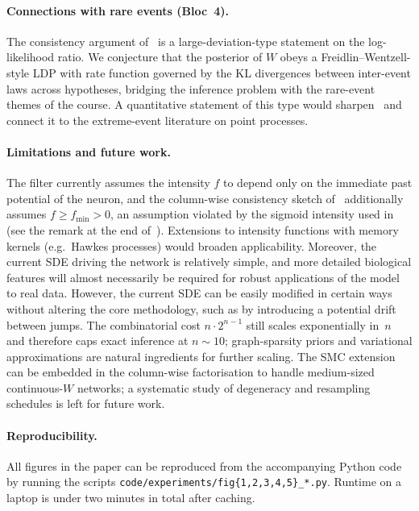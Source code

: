 \documentclass[11pt,a4paper]{article}
\theoremstyle{definition}
\begin{document}
\paragraph{Connections with rare events (Bloc~4).} The consistency
argument of~ is a large-deviation-type
statement on the log-likelihood ratio. We conjecture that the
posterior of $W$ obeys a Freidlin--Wentzell-style LDP with rate
function governed by the KL divergences between inter-event laws
across hypotheses, bridging the inference problem with the rare-event
themes of the course. A quantitative statement of this type would
sharpen~ and connect it to the extreme-event
literature on point processes.

\paragraph{Limitations and future work.} The filter currently assumes
the intensity $f$ to depend only on the immediate past potential of the neuron, and the column-wise consistency sketch of~ additionally assumes $f \geq f_{\min} > 0$, an assumption violated by the sigmoid intensity used in~ (see the remark at the end of~). Extensions to intensity functions with memory kernels (e.g.\ Hawkes
processes) would broaden applicability. Moreover, the current SDE driving the network is relatively simple, and more detailed biological features will almost necessarily be required for robust applications of the model to real data. However, the current SDE can be easily modified in certain ways without altering the core methodology, such as by introducing a potential drift between jumps. The
combinatorial cost $n\cdot 2^{n-1}$ still scales exponentially in~$n$
and therefore caps exact inference at $n \sim 10$; graph-sparsity
priors and variational approximations are natural ingredients for
further scaling. The SMC extension can be embedded in the column-wise
factorisation to handle medium-sized continuous-$W$ networks; a
systematic study of degeneracy and resampling schedules is left for
future work.

\paragraph{Reproducibility.} All figures in the paper can be
reproduced from the accompanying Python code by running the scripts
\texttt{code/experiments/fig\{1,2,3,4,5\}\_*.py}. Runtime on a laptop
is under two minutes in total after caching.
\end{document}
